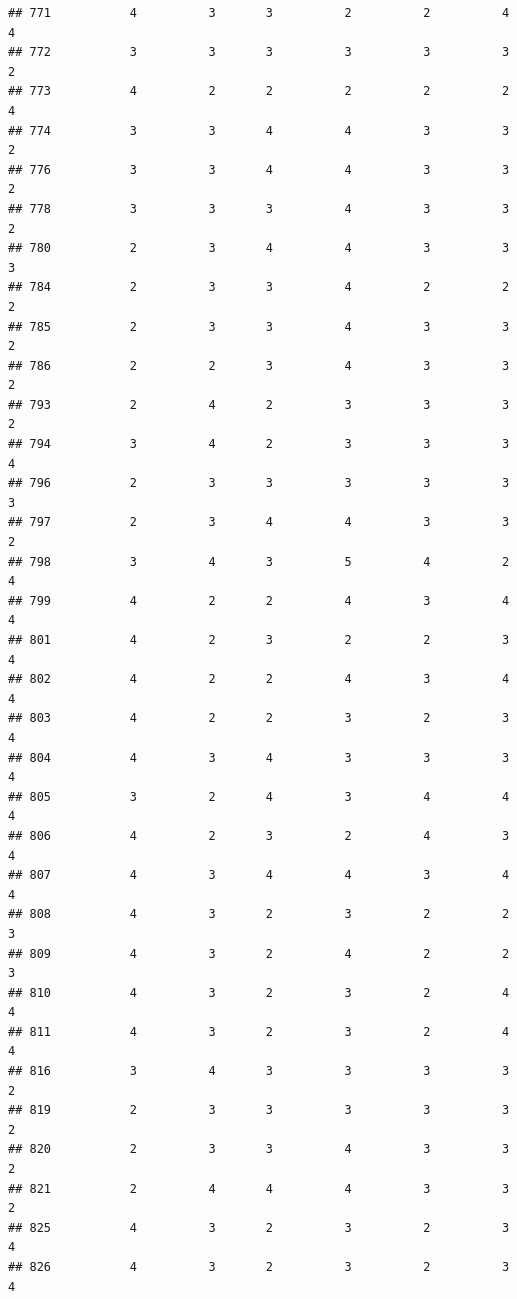 \documentclass[
]{article}
\begin{document}
\begin{verbatim}
## 771           4          3       3          2          2          4        4
## 772           3          3       3          3          3          3        2
## 773           4          2       2          2          2          2        4
## 774           3          3       4          4          3          3        2
## 776           3          3       4          4          3          3        2
## 778           3          3       3          4          3          3        2
## 780           2          3       4          4          3          3        3
## 784           2          3       3          4          2          2        2
## 785           2          3       3          4          3          3        2
## 786           2          2       3          4          3          3        2
## 793           2          4       2          3          3          3        2
## 794           3          4       2          3          3          3        4
## 796           2          3       3          3          3          3        3
## 797           2          3       4          4          3          3        2
## 798           3          4       3          5          4          2        4
## 799           4          2       2          4          3          4        4
## 801           4          2       3          2          2          3        4
## 802           4          2       2          4          3          4        4
## 803           4          2       2          3          2          3        4
## 804           4          3       4          3          3          3        4
## 805           3          2       4          3          4          4        4
## 806           4          2       3          2          4          3        4
## 807           4          3       4          4          3          4        4
## 808           4          3       2          3          2          2        3
## 809           4          3       2          4          2          2        3
## 810           4          3       2          3          2          4        4
## 811           4          3       2          3          2          4        4
## 816           3          4       3          3          3          3        2
## 819           2          3       3          3          3          3        2
## 820           2          3       3          4          3          3        2
## 821           2          4       4          4          3          3        2
## 825           4          3       2          3          2          3        4
## 826           4          3       2          3          2          3        4

\end{verbatim}
\end{document}
